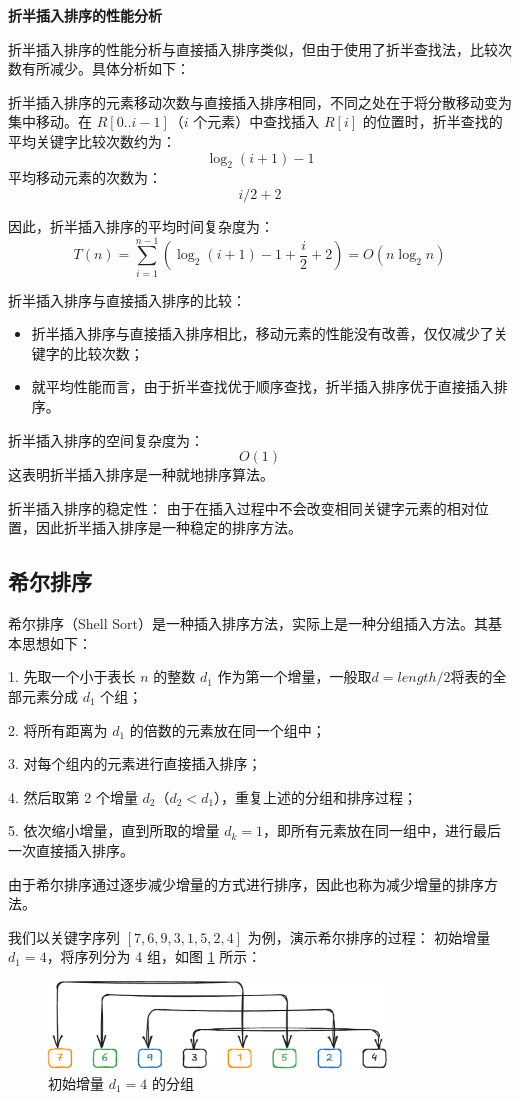 \documentclass[lang=cn,newtx,10pt,scheme=chinese]{elegantbook}
\begin{document}
\textbf{折半插入排序的性能分析}

折半插入排序的性能分析与直接插入排序类似，但由于使用了折半查找法，比较次数有所减少。具体分析如下：


折半插入排序的元素移动次数与直接插入排序相同，不同之处在于将分散移动变为集中移动。在 $R[0..i-1]$（$i$ 个元素）中查找插入 $R[i]$ 的位置时，折半查找的平均关键字比较次数约为：
\[
\log_2(i+1) - 1
\]
平均移动元素的次数为：
\[
i/2 + 2
\]

因此，折半插入排序的平均时间复杂度为：
\[
T(n) = \sum_{i=1}^{n-1} \left(\log_2(i+1) - 1 + \frac{i}{2} + 2\right) = O(n \log_2 n)
\]


折半插入排序与直接插入排序的比较：
\begin{itemize}
  \item 折半插入排序与直接插入排序相比，移动元素的性能没有改善，仅仅减少了关键字的比较次数；
  \item 就平均性能而言，由于折半查找优于顺序查找，折半插入排序优于直接插入排序。
\end{itemize}


折半插入排序的空间复杂度为：
\[
O(1)
\]
这表明折半插入排序是一种就地排序算法。

折半插入排序的稳定性：  
由于在插入过程中不会改变相同关键字元素的相对位置，因此折半插入排序是一种稳定的排序方法。

\subsection{希尔排序}
希尔排序（Shell Sort）是一种插入排序方法，实际上是一种分组插入方法。其基本思想如下：

1. 先取一个小于表长 $n$ 的整数 $d_1$ 作为第一个增量，一般取$d = length/2$将表的全部元素分成 $d_1$ 个组；

2. 将所有距离为 $d_1$ 的倍数的元素放在同一个组中；

3. 对每个组内的元素进行直接插入排序；

4. 然后取第 2 个增量 $d_2$（$d_2 < d_1$），重复上述的分组和排序过程；

5. 依次缩小增量，直到所取的增量 $d_k = 1$，即所有元素放在同一组中，进行最后一次直接插入排序。

由于希尔排序通过逐步减少增量的方式进行排序，因此也称为减少增量的排序方法。

我们以关键字序列 $[7,6,9,3,1,5,2,4]$ 为例，演示希尔排序的过程：
初始增量 $d_1 = 4$，将序列分为 4 组，如图 \ref{fig:shellSort1} 所示：
\begin{figure}[h!]
    \centering
    \includegraphics[width=0.8\textwidth]{./figure/pdf/cropped/shell(a).pdf}
    \caption{初始增量 $d_1 = 4$ 的分组}
    \label{fig:shellSort1}
\end{figure}
\end{document}
